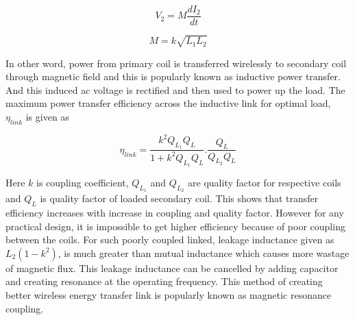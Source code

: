 \documentclass[12pt,a4paper,UKenglish]{report}
\begin{document}
\begin{equation} \label{eq:induced_v} %
V_{2} = M\frac{dI_{2}}{dt}
\end{equation}

\begin{equation} \label{eq:mutual_ind} %
 M =k{\sqrt{L_{1}L_{2}}}
\end{equation}

In other word, power from primary coil is transferred wirelessly to secondary coil through magnetic field and this is popularly known as inductive power transfer. And this 
induced ac voltage is rectified and then used to power up the load.
The maximum power transfer efficiency across the inductive link for optimal load, $\eta_{link}$ is given as  \cite{ant_PSC_geometry}

\begin{equation} \label{eq:effi_link}	%
\eta_{link} = \frac{k^2Q_{L_{1}} Q_{L}} {  1 + k^2Q_{L_{1}} Q_{L} } . \frac{Q_{L}}{Q_{L_{2}}Q_{L}} %
\end{equation} 

Here $k$ is coupling coefficient, $Q_{L_{1}}$ and $Q_{L_{2}}$ are quality factor for respective coils  and $Q_{L}$ is quality factor of loaded secondary coil. This shows that transfer 
efficiency increases with increase in coupling and quality factor. However for any practical design, it is impossible to get higher efficiency because of poor coupling between the coils. For such poorly coupled linked, leakage inductance given as $L_{2}(1-k^2)$, is much greater than mutual inductance\cite{koen_robert_2009} which causes more wastage of magnetic flux. This leakage 
inductance can be cancelled by adding capacitor and creating resonance at the operating frequency.  This method of creating better wireless 
energy transfer link is popularly known as magnetic resonance coupling. \\ 

\end{document}
